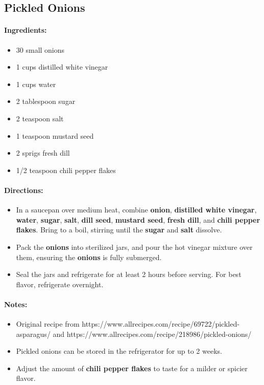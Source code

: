 \documentclass{article}
\begin{document}
\subsection{Pickled Onions}

\paragraph{Ingredients:}
\begin{itemize}
    \item 30 small onions
    \item 1 cups distilled white vinegar
    \item 1 cups water
    \item 2 tablespoon sugar
    \item 2 teaspoon salt
    \item 1 teaspoon mustard seed
    \item 2 sprigs fresh dill
    \item 1/2 teaspoon chili pepper flakes
\end{itemize}

\paragraph{Directions:}
\begin{itemize}
    \item In a saucepan over medium heat, combine \textbf{onion}, \textbf{distilled white vinegar}, \textbf{water}, \textbf{sugar}, \textbf{salt}, \textbf{dill seed}, \textbf{mustard seed}, \textbf{fresh dill}, and \textbf{chili pepper flakes}. Bring to a boil, stirring until the \textbf{sugar} and \textbf{salt} dissolve.
    \item Pack the \textbf{onions} into sterilized jars, and pour the hot vinegar mixture over them, ensuring the \textbf{onions} is fully submerged.
    \item Seal the jars and refrigerate for at least 2 hours before serving. For best flavor, refrigerate overnight.
\end{itemize}

\paragraph{Notes:}
\begin{itemize}
    \item Original recipe from https://www.allrecipes.com/recipe/69722/pickled-asparagus/ and https://www.allrecipes.com/recipe/218986/pickled-onions/
    \item Pickled onions can be stored in the refrigerator for up to 2 weeks.
    \item Adjust the amount of \textbf{chili pepper flakes} to taste for a milder or spicier flavor.
\end{itemize}
\end{document}

